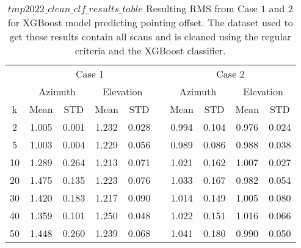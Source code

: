 \begin{table}[!htbp]
    \centering
    \caption{$tmp2022\_clean\_clf\_results\_table$
    Resulting RMS from Case $1$ and $2$ for XGBoost model predicting pointing offset.
    The dataset used to get these results contain all scans and is cleaned using the regular criteria and the XGBoost classifier.}
    \begin{tabular}{ccccc c cccc}
        \toprule
        \multicolumn{1}{c}{} & \multicolumn{4}{c}{Case 1} & & \multicolumn{4}{c}{Case 2} \\
        \cmidrule(lr){2-5} \cmidrule(lr){7-10}
        \multicolumn{1}{c}{} & \multicolumn{2}{c}{Azimuth} & \multicolumn{2}{c}{Elevation} & & \multicolumn{2}{c}{Azimuth} & \multicolumn{2}{c}{Elevation} \\ 
        \cmidrule(lr){2-5} \cmidrule(lr){7-10}
        k & Mean & STD & Mean & STD & & Mean & STD & Mean & STD \\ 
        \midrule
         2 &     1.005 &     0.001 &     1.232 &     0.028 &  &  0.994 &     0.104 &     0.976 &     0.024 \\
         5 &     1.003 &     0.004 &     1.229 &     0.056 &  &  0.989 &     0.086 &     0.988 &     0.038 \\
        10 &     1.289 &     0.264 &     1.213 &     0.071 &  &  1.021 &     0.162 &     1.007 &     0.027 \\
        20 &     1.475 &     0.135 &     1.223 &     0.076 &  &  1.033 &     0.167 &     0.982 &     0.054 \\
        30 &     1.420 &     0.183 &     1.217 &     0.090 &  &  1.014 &     0.149 &     1.005 &     0.080 \\
        40 &     1.359 &     0.101 &     1.250 &     0.048 &  &  1.022 &     0.151 &     1.016 &     0.066 \\
        50 &     1.448 &     0.260 &     1.239 &     0.068 &  &  1.041 &     0.180 &     0.990 &     0.050 \\
        \bottomrule
    \end{tabular}
\end{table}


